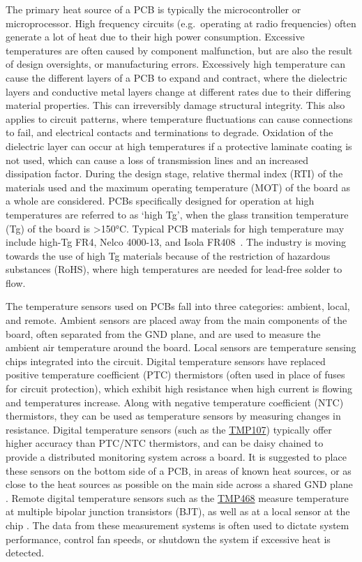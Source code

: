 The primary heat source of a PCB is typically the microcontroller or microprocessor. High frequency circuits (e.g.~operating at radio frequencies) often generate a lot of heat due to their high power consumption. Excessive temperatures are often caused by component malfunction, but are also the result of design oversights, or manufacturing errors. Excessively high temperature can cause the different layers of a PCB to expand and contract, where the dielectric layers and conductive metal layers change at different rates due to their differing material properties. This can irreversibly damage structural integrity. This also applies to circuit patterns, where temperature fluctuations can cause connections to fail, and electrical contacts and terminations to degrade. Oxidation of the dielectric layer can occur at high temperatures if a protective laminate coating is not used, which can cause a loss of transmission lines and an increased dissipation factor. During the design stage, relative thermal index (RTI) of the materials used and the maximum operating temperature (MOT) of the board as a whole are considered. PCBs specifically designed for operation at high temperatures are referred to as `high Tg', when the glass transition temperature (Tg) of the board is >150\unit{\degreeCelsius}. Typical PCB materials for high temperature may include high-Tg FR4, Nelco 4000-13, and Isola FR408~\cite{Ehrler2002}. The industry is moving towards the use of high Tg materials because of the restriction of hazardous substances (RoHS), where high temperatures are needed for lead-free solder to flow.

\clearpage

The temperature sensors used on PCBs fall into three categories: ambient, local, and remote. Ambient sensors are placed away from the main components of the board, often separated from the GND plane, and are used to measure the ambient air temperature around the board. Local sensors are temperature sensing chips integrated into the circuit. Digital temperature sensors have replaced positive temperature coefficient (PTC) thermistors (often used in place of fuses for circuit protection), which exhibit high resistance when high current is flowing and temperatures increase. Along with negative temperature coefficient (NTC) thermistors, they can be used as temperature sensors by measuring changes in resistance. Digital temperature sensors (such as the \href{https://www.ti.com/product/TMP107#features}{TMP107}) typically offer higher accuracy than PTC/NTC thermistors, and can be daisy chained to provide a distributed monitoring system across a board. It is suggested to place these sensors on the bottom side of a PCB, in areas of known heat sources, or as close to the heat sources as possible on the main side across a shared GND plane \cite{Kasemsadeh2017}. Remote digital temperature sensors such as the \href{https://www.ti.com/product/TMP468}{TMP468} measure temperature at multiple bipolar junction transistors (BJT), as well as at a local sensor at the chip \cite{Vaseliou2017}. The data from these measurement systems is often used to dictate system performance, control fan speeds, or shutdown the system if excessive heat is detected. 

